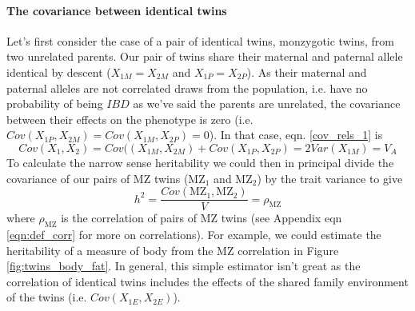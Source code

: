 \paragraph{The covariance between identical twins}
Let's first consider the case of a pair of identical twins, monzygotic
twins, from two
unrelated parents. Our pair of twins share their maternal and paternal
allele identical by descent ($X_{1M}=X_{2M}$ and $X_{1P}=X_{2P}$). As their maternal and
paternal alleles are not correlated draws from the population,
i.e. have no probability of being $IBD$ as we've said the parents are unrelated, the
covariance between their effects on the phenotype is zero  
(i.e. $Cov(X_{1P},X_{2M})=Cov(X_{1M},X_{2P})=0$). In that case,
eqn. \ref{cov_rels_1} is
\begin{equation}
Cov(X_1,X_2) = Cov((X_{1M},X_{2M})+Cov(X_{1P},X_{2P}) = 2Var(X_{1M})
= V_A
\end{equation}
To calculate the narrow sense heritability we could then in principal divide the
covariance of our pairs of MZ  twins (MZ$_1$ and MZ$_2$) by the trait variance to give
\begin{equation}
h^2 = \frac{Cov(\text{MZ}_1, \text{MZ}_2) }{V} =
\rho_{\text{MZ}}
\end{equation}
where $\rho_{\text{MZ}}$ is the correlation of pairs of MZ twins (see
Appendix eqn \eqref{eqn:def_corr} for more on correlations).
For example, we could estimate the heritability of a measure of body
from the MZ correlation in Figure \ref{fig:twins_body_fat}. In general, this simple estimator isn't great as the correlation of
identical twins includes the effects of the shared family
environment of the twins (i.e. $Cov(X_{1E},X_{2E})$).

